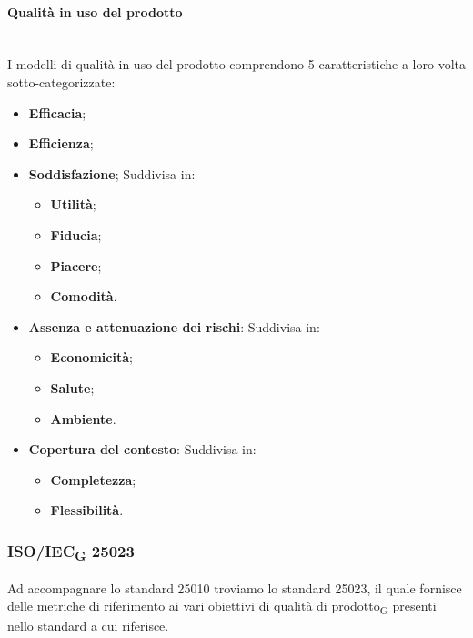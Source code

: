 \paragraph {Qualità in uso del prodotto}\mbox{}\\
I modelli di qualità in uso del prodotto comprendono 5 caratteristiche a loro volta sotto-categorizzate:
\begin{itemize}
	\item \textbf{Efficacia};
	\item \textbf{Efficienza};
	\item \textbf{Soddisfazione};
	Suddivisa in:
	\begin{itemize}
		\item \textbf{Utilità};
		\item \textbf{Fiducia};
		\item \textbf{Piacere};
		\item \textbf{Comodità}.
	\end{itemize}
	\item \textbf{Assenza e attenuazione dei rischi}: Suddivisa in:
	\begin{itemize}
		\item \textbf{Economicità};
		\item \textbf{Salute};
		\item \textbf{Ambiente}.
	\end{itemize}
	\item \textbf{Copertura del contesto}: Suddivisa in:
	\begin{itemize}
		\item \textbf{Completezza};
		\item \textbf{Flessibilità}.
	\end{itemize}
\end{itemize}
\subsubsection{ISO/IEC\textsubscript{G} 25023}
Ad accompagnare lo standard 25010 troviamo lo standard 25023, il quale fornisce delle metriche di riferimento ai vari obiettivi di qualità di prodotto\textsubscript{G} presenti nello standard a cui riferisce.





